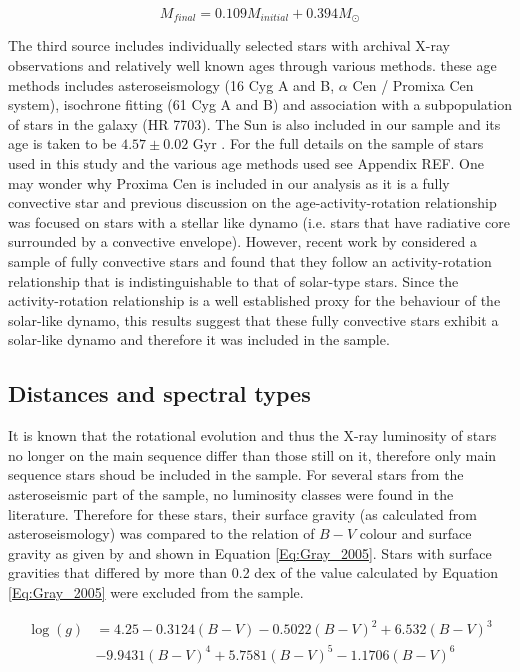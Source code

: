 \begin{equation}
    M_{final} = 0.109M_{initial} + 0.394M_{\odot}
    \label{Eq:WD_init_final_relationship}
\end{equation}

The third source includes individually selected stars with archival X-ray observations and relatively well known ages through various methods. these age methods includes asteroseismology (16 Cyg A and B, $\alpha$ Cen / Promixa Cen system), isochrone fitting (61 Cyg A and B) and association with a subpopulation of stars in the galaxy (HR 7703). The Sun is also included in our sample and its age is taken to be $4.57 \pm 0.02$ Gyr \citep{Bahcall_etal_1995}. For the full details on the sample of stars used in this study and the various age methods used see Appendix REF. One may wonder why Proxima Cen is included in our analysis as it is a fully convective star and previous discussion on the age-activity-rotation relationship was focused on stars with a stellar like dynamo (i.e. stars that have radiative core surrounded by a convective envelope). However, recent work by \citet{Wright_Drake_2016} considered a sample of fully convective stars and found that they follow an activity-rotation relationship that is indistinguishable to that of solar-type stars. Since the activity-rotation relationship is a well established proxy for the behaviour of the solar-like dynamo, this results suggest that these fully convective stars exhibit a solar-like dynamo and therefore it was included in the sample.

\subsection{Distances and spectral types}
\label{Section_Xray_distances_and_spectype}
It is known that the rotational evolution and thus the X-ray luminosity of stars no longer on the main sequence differ than those still on it, therefore only main sequence stars shoud be included in the sample. For several stars from the asteroseismic part of the sample, no luminosity classes were found in the literature. Therefore for these stars, their surface gravity (as calculated from asteroseismology) was compared to the relation of $B-V$ colour and surface gravity as given by \citet{Gray_2005} and shown in Equation \ref{Eq:Gray_2005}. Stars with surface gravities that differed by more than 0.2 dex of the value calculated by Equation \ref{Eq:Gray_2005} were excluded from the sample.

\begin{equation}
    \begin{aligned}
    \log(g) & = 4.25 - 0.3124(B-V) - 0.5022(B-V)^{2} + 6.532(B-V)^{3} \\
    &- 9.9431(B-V)^{4} + 5.7581(B-V)^{5} - 1.1706(B-V)^{6}
    \label{Eq:Gray_2005}
    \end{aligned}
\end{equation}

